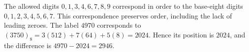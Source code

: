 The allowed digits $0,1,3,4,6,7,8,9$ correspond in order to the base-eight digits $0,1,2,3,4,5,6,7$. This correspondence preserves order, including the lack of leading zeroes. The label $4970$ corresponds to $(3750)_8=3(512)+7(64)+5(8)=2024$. Hence its position is $\boxed{2024}$, and the difference is $\boxed{4970-2024=2946}$.
